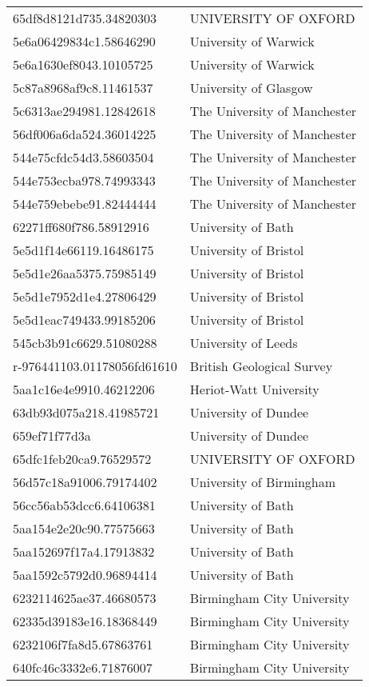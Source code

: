 \begin{tabular}{ll}
65df8d8121d735.34820303 & UNIVERSITY OF OXFORD \\
5e6a06429834c1.58646290 & University of Warwick \\
5e6a1630ef8043.10105725 & University of Warwick \\
5c87a8968af9c8.11461537 & University of Glasgow \\
5c6313ae294981.12842618 & The University of Manchester \\
56df006a6da524.36014225 & The University of Manchester \\
544e75cfdc54d3.58603504 & The University of Manchester \\
544e753ecba978.74993343 & The University of Manchester \\
544e759ebebe91.82444444 & The University of Manchester \\
62271ff680f786.58912916 & University of Bath \\
5e5d1f14e66119.16486175 & University of Bristol \\
5e5d1e26aa5375.75985149 & University of Bristol \\
5e5d1e7952d1e4.27806429 & University of Bristol \\
5e5d1eac749433.99185206 & University of Bristol \\
545cb3b91c6629.51080288 & University of Leeds \\
r-976441103.01178056fd61610 & British Geological Survey \\
5aa1c16e4e9910.46212206 & Heriot-Watt University \\
63db93d075a218.41985721 & University of Dundee \\
659ef71f77d3a & University of Dundee \\
65dfc1feb20ca9.76529572 & UNIVERSITY OF OXFORD \\
56d57c18a91006.79174402 & University of Birmingham \\
56cc56ab53dcc6.64106381 & University of Bath \\
5aa154e2e20c90.77575663 & University of Bath \\
5aa152697f17a4.17913832 & University of Bath \\
5aa1592c5792d0.96894414 & University of Bath \\
6232114625ae37.46680573 & Birmingham City University \\
62335d39183e16.18368449 & Birmingham City University \\
6232106f7fa8d5.67863761 & Birmingham City University \\
640fc46c3332e6.71876007 & Birmingham City University \\

\end{tabular}
